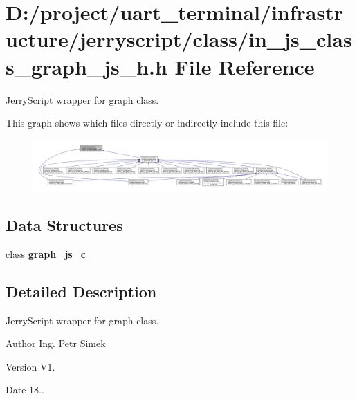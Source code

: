 \section{D\+:/project/uart\+\_\+terminal/infrastructure/jerryscript/class/in\+\_\+js\+\_\+class\+\_\+graph\+\_\+js\+\_\+h.h File Reference}
\label{in__js__class__graph__js__h_8h}


Jerry\+Script wrapper for graph class.  


This graph shows which files directly or indirectly include this file\+:\nopagebreak
\begin{figure}[H]
\begin{center}
\leavevmode
\includegraphics[width=350pt]{in__js__class__graph__js__h_8h__dep__incl}
\end{center}
\end{figure}
\subsection*{Data Structures}
\begin{DoxyCompactItemize}
\item 
class \textbf{ graph\+\_\+js\+\_\+c}
\end{DoxyCompactItemize}


\subsection{Detailed Description}
Jerry\+Script wrapper for graph class. 

\begin{DoxyAuthor}{Author}
Ing. Petr Simek 
\end{DoxyAuthor}
\begin{DoxyVersion}{Version}
V1. 
\end{DoxyVersion}
\begin{DoxyDate}{Date}
18.. 
\end{DoxyDate}
